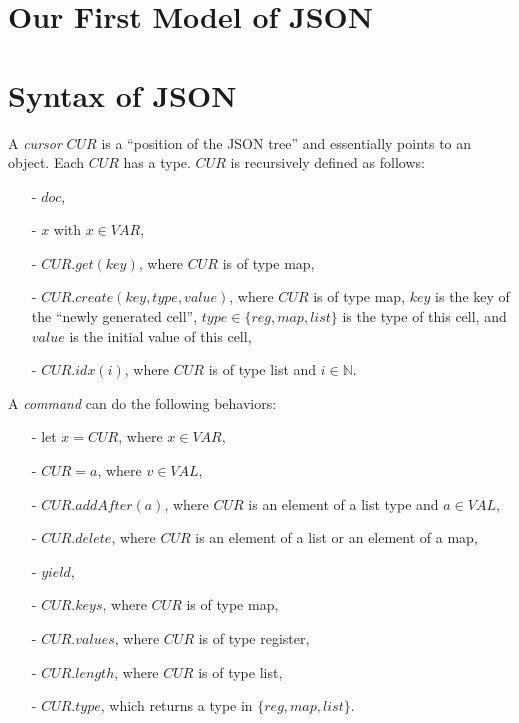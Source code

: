 
\section{Our First Model of JSON}
\label{sec:our first model of json}



\section{Syntax of JSON}
\label{sec:syntax of json}

A \emph{cursor} $CUR$ is a ``position of the JSON tree'' and essentially points to an object. Each $CUR$ has a type. $CUR$ is recursively defined as follows: 

\begin{itemize}
\setlength{\itemsep}{0.5pt}
\item[-] $doc$,

\item[-] $x$ with $x \in VAR$,

\item[-] $CUR.get(key)$, where $CUR$ is of type map,

\item[-] $CUR.create(key, type, value)$, where $CUR$ is of type map, $key$ is the key of the ``newly generated cell'', $type \in \{ \mathit{reg}, \mathit{map}, \mathit{list} \}$ is the type of this cell, and $value$ is the initial value of this cell,  

\item[-] $CUR.idx(i)$, where $CUR$ is of type list and $i \in \mathbb{N}$.
\end{itemize}

A \emph{command} can do the following behaviors:

\begin{itemize}
\setlength{\itemsep}{0.5pt}
\item[-] let $x = CUR$, where $x \in VAR$,

\item[-] $CUR = a$, where $v \in VAL$,

\item[-] $CUR.addAfter(a)$, where $CUR$ is an element of a list type and $a \in VAL$,

\item[-] $CUR.delete$, where $CUR$ is an element of a list or an element of a map,

\item[-] $yield$,

\item[-] $CUR.keys$, where $CUR$ is of type map,

\item[-] $CUR.values$, where $CUR$ is of type register,

\item[-] $CUR.length$, where $CUR$ is of type list,

\item[-] $CUR.type$, which returns a type in $\{ \mathit{reg}, \mathit{map}, \mathit{list} \}$.
\end{itemize}

